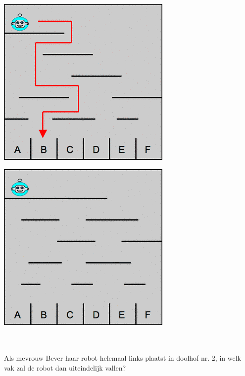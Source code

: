 \documentclass[12pt, a4paper]{article}
\begin{document}
\begin{minipage}{\textwidth}
			\begin{minipage}{0.49\linewidth}
				\includegraphics[width=\linewidth]{image1}
			\end{minipage} \hfill
			\begin{minipage}{0.49\linewidth}
				\includegraphics[width=\linewidth]{image2}
			\end{minipage} \\ \\

			Als mevrouw Bever haar robot helemaal links plaatst in doolhof nr. 2, in welk vak zal de robot dan uiteindelijk vallen?

	\end{minipage} \\ \\
	
\end{document}
